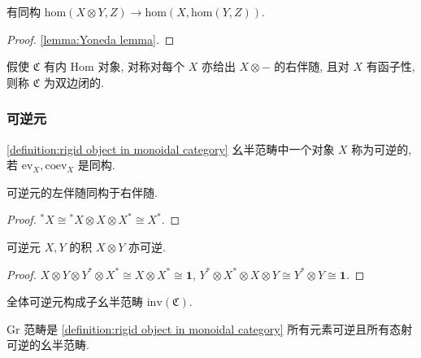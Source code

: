 \begin{lemma}
    有同构 \(\mathrm{hom} (X \otimes Y,Z) \to \mathrm{hom} (X,\mathrm{hom} (Y,Z))\).

    \begin{proof}
        \ref{lemma:Yoneda lemma}.
    \end{proof}
\end{lemma}

\begin{definition}
    \label {definition:biclosed monoidal category}
    假使 \(\mathfrak{C}\) 有内 \(\mathrm{Hom}\) 对象, 对称对每个 \(X\) 亦给出 \(X \otimes -\) 的右伴随,
    且对 \(X\) 有函子性, 则称 \(\mathfrak{C}\) 为双边闭的.
\end{definition}

\subsubsection{可逆元}

\begin{definition}[可逆元]
    \label {definition:invertible element in monoidal category}
    \ref{definition:rigid object in monoidal category} 幺半范畴中一个对象 \(X\) 称为可逆的, 若 \(\mathrm{ev}_X, \mathrm{coev}_X\) 是同构.
\end{definition}

\begin{lemma}
    可逆元的左伴随同构于右伴随.

    \begin{proof}
        \(^\ast X \cong {^\ast X} \otimes X \otimes X^\ast \cong X^\ast\).
    \end{proof}
\end{lemma}

\begin{lemma}
    可逆元 \(X,Y\) 的积 \(X \otimes Y\) 亦可逆.

    \begin{proof}
        \(X \otimes Y \otimes Y^\ast \otimes X^\ast \cong X \otimes X^\ast \cong \mathbf{1}\),
        \(Y^\ast \otimes X^\ast \otimes X \otimes Y \cong Y^\ast \otimes Y \cong \mathbf{1}\).
    \end{proof}
\end{lemma}

\begin{definition}
    全体可逆元构成子幺半范畴 \(\mathrm{inv} (\mathfrak{C})\).
\end{definition}

\begin{definition}
    \(\mathrm{Gr}\) 范畴是 \ref{definition:rigid object in monoidal category} 所有元素可逆且所有态射可逆的幺半范畴.
\end{definition}

